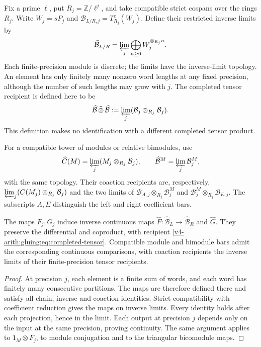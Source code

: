 Fix a prime \(\ell\), put \(R_j=\mathbb Z/\ell^j\), and take compatible
strict cospans over the rings \(R_j\). Write \(W_j=sP_j\) and
\(\mathcal B_{L/R,j}=T_{R_j}^c(W_j)\). Define their restricted
inverse limits by
\[
 \widehat{\mathcal B}_{L/R}
       =\varprojlim_j\bigoplus_{n\geq0}W_j^{\otimes_{R_j}n}.
\]
Each finite-precision module is discrete; the limits have the
inverse-limit topology. An element has only finitely many nonzero
word lengths at any fixed precision, although the number of such
lengths may grow with \(j\). The completed tensor recipient is defined
here to be
\begin{equation}\label{v4-arith:gluing:eq:completed-tensor}
 \widehat{\mathcal B}\,\widehat\otimes\,\widehat{\mathcal B}
       :=\varprojlim_j
           (\mathcal B_j\otimes_{R_j}\mathcal B_j).
\end{equation}
This definition makes no identification with a different completed
tensor product.

For a compatible tower of modules or relative bimodules, use
\[
 \widehat C(M)=\varprojlim_j(M_j\otimes_{R_j}\mathcal B_j),
 \qquad \widehat{\mathcal B}^M=\varprojlim_j\mathcal B_j^M,
\]
with the same topology. Their coaction recipients are, respectively,
\(\varprojlim_j(C(M_j)\otimes_{R_j}\mathcal B_j)\) and the two
limits of \(\mathcal B_{A,j}\otimes_{R_j}\mathcal B_j^M\) and
\(\mathcal B_j^M\otimes_{R_j}\mathcal B_{E,j}\). The subscripts
\(A,E\) distinguish the left and right coefficient bars.

\begin{theorem}\label{v4-arith:gluing:thm:completion}
The maps \(F_j,G_j\) induce inverse continuous maps
\(\widehat F:\widehat{\mathcal B}_L\to\widehat{\mathcal B}_R\) and
\(\widehat G\). They preserve the differential and coproduct, with
recipient \eqref{v4-arith:gluing:eq:completed-tensor}. Compatible
module and bimodule bars admit the corresponding continuous
comparisons, with coaction recipients the inverse limits of their
finite-precision tensor recipients.
\end{theorem}

\begin{proof}
At precision \(j\), each element is a finite sum of words, and each
word has finitely many consecutive partitions. The maps are therefore
defined there and satisfy all chain, inverse and coaction identities.
Strict compatibility with coefficient reduction gives the maps on
inverse limits. Every identity holds after each projection, hence in
the limit. Each output at precision \(j\) depends only on the input
at the same precision, proving continuity. The same argument applies
to \(1_M\otimes F_j\), to module conjugation and to the triangular
bicomodule maps.
\end{proof}


